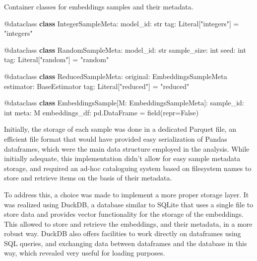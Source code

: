 \documentclass[
  a4paper, twoside, 10pt, titlepage]{book}
\newenvironment{Shaded}{}{}
\newcommand{\AttributeTok}[1]{\textcolor[rgb]{0.49,0.56,0.16}{#1}}
\newcommand{\BuiltInTok}[1]{\textcolor[rgb]{0.00,0.50,0.00}{#1}}
\newcommand{\KeywordTok}[1]{\textcolor[rgb]{0.00,0.44,0.13}{\textbf{#1}}}
\newcommand{\NormalTok}[1]{#1}
\newcommand{\OperatorTok}[1]{\textcolor[rgb]{0.40,0.40,0.40}{#1}}
\newcommand{\StringTok}[1]{\textcolor[rgb]{0.25,0.44,0.63}{#1}}
\newcommand{\VariableTok}[1]{\textcolor[rgb]{0.10,0.09,0.49}{#1}}
\begin{document}
\begin{codelisting}

\caption{Container classes for embeddings samples and their
metadata.}\label{lst:embeddingsample}

\begin{Shaded}
\begin{Highlighting}[]

\AttributeTok{@dataclass}
\KeywordTok{class}\NormalTok{ IntegerSampleMeta:}
\NormalTok{    model\_id: }\BuiltInTok{str}
\NormalTok{    tag: Literal[}\StringTok{"integers"}\NormalTok{] }\OperatorTok{=} \StringTok{"integers"}

\AttributeTok{@dataclass}
\KeywordTok{class}\NormalTok{ RandomSampleMeta:}
\NormalTok{model\_id: }\BuiltInTok{str}
\NormalTok{    sample\_size: }\BuiltInTok{int}
\NormalTok{    seed: }\BuiltInTok{int}
\NormalTok{    tag: Literal[}\StringTok{"random"}\NormalTok{] }\OperatorTok{=} \StringTok{"random"}

\AttributeTok{@dataclass}
\KeywordTok{class}\NormalTok{ ReducedSampleMeta:}
\NormalTok{    original: EmbeddingsSampleMeta}
\NormalTok{    estimator: BaseEstimator}
\NormalTok{    tag: Literal[}\StringTok{"reduced"}\NormalTok{] }\OperatorTok{=} \StringTok{"reduced"}

\AttributeTok{@dataclass}
\KeywordTok{class}\NormalTok{ EmbeddingsSample[M: EmbeddingsSampleMeta]:}
\NormalTok{    sample\_id: }\BuiltInTok{int}
\NormalTok{    meta: M}
\NormalTok{    embeddings\_df: pd.DataFrame }\OperatorTok{=}\NormalTok{ field(}\BuiltInTok{repr}\OperatorTok{=}\VariableTok{False}\NormalTok{)}
\end{Highlighting}
\end{Shaded}

\end{codelisting}

Initially, the storage of each sample was done in a dedicated Parquet
file, an efficient file format that would have provided easy
serialization of Pandas dataframes, which were the main data structure
employed in the analysis. While initially adequate, this implementation
didn't allow for easy sample metadata storage, and required an ad-hoc
cataloguing system based on filesystem names to store and retrieve items
on the basis of their metadata.

To address this, a choice was made to implement a more proper storage
layer. It was realized using DuckDB, a database similar to SQLite that
uses a single file to store data and provides vector functionality for
the storage of the embeddings. This allowed to store and retrieve the
embeddings, and their metadata, in a more robust way. DuckDB also offers
facilities to work directly on dataframes using SQL queries, and
exchanging data between dataframes and the database in this way, which
revealed very useful for loading purposes.
\end{document}

